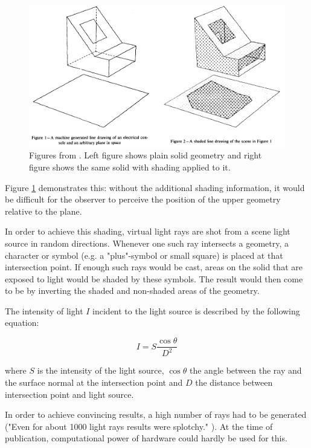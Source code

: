 \begin{figure}[h]
	\centering
	\includegraphics[width=1\linewidth]{img/1 fundamentals/appel_comp}
	\caption{Figures from \cite{appel1968some}. Left figure shows plain solid geometry and right figure shows the same solid with shading applied to it.}
	\label{fig:appel}
\end{figure}

Figure \ref{fig:appel} demonstrates this: without the additional shading information, it would be difficult for the observer to perceive the position of the upper geometry relative to the plane.

In order to achieve this shading, virtual light rays are shot from a scene light source in random directions. Whenever one such ray intersects a geometry, a character or symbol (e.g. a "plus"-symbol or small square) is placed at that intersection point. If enough such rays would be cast, areas on the solid that are exposed to light would be shaded by these symbols.
The result would then come to be by inverting the shaded and non-shaded areas of the geometry.

The intensity of light $I$ incident to the light source is described by the following equation:

\begin{equation}
I = S\frac{\cos{\theta}}{{D}^2}
\end{equation}

where $S$ is the intensity of the light source, $\cos{\theta}$ the angle between the ray and the surface normal at the intersection point and $D$ the distance between intersection point and light source.

In order to achieve convincing results, a high number of rays had to be generated ("Even for about 1000 light rays results were splotchy." \cite[p 3]{appel1968some}). At the time of publication, computational power of hardware could hardly be used for this.

